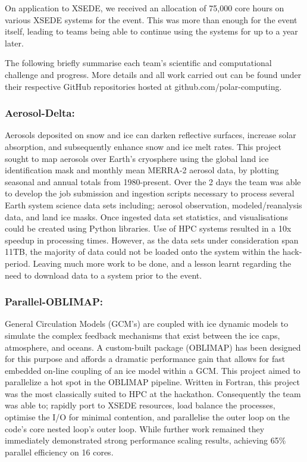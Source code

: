 \documentclass[conference]{IEEEtran}
\begin{document}
On application to XSEDE, we received an allocation of 75,000 core hours on various XSEDE systems for the event.  This was more than enough for the event itself, leading to teams being able to continue using the systems for up to a year later.

The following briefly summarise each team’s scientific and computational challenge and progress.  More details and all work carried out can be found under their respective GitHub repositories hosted at github.com/polar-computing.
\subsubsection{Aerosol-Delta:}
Aerosols deposited on snow and ice can darken reflective surfaces, increase solar absorption, and subsequently enhance snow and ice melt rates. This project sought to map aerosols over Earth's cryosphere using the global land ice identification mask and monthly mean MERRA-2 aerosol data, by plotting seasonal and annual totals from 1980-present. Over the 2 days the team was able to develop the job submission and ingestion scripts necessary to process several Earth system science data sets including; aerosol observation, modeled/reanalysis data, and land ice masks.  Once ingested data set statistics, and visualisations could be created using Python libraries.  Use of HPC systems resulted in a 10x speedup in processing times.  However, as the data sets under consideration span 11TB, the majority of data could not be loaded onto the system within the hack-period. Leaving much more work to be done, and a lesson learnt regarding the need to download data to a system prior to the event.
\subsubsection{Parallel-OBLIMAP:}
General Circulation Models (GCM's) are coupled with ice dynamic models to simulate the complex feedback mechanisms that exist between the ice caps, atmosphere, and oceans. A custom-built package (OBLIMAP\cite{Reerink2016-xr}) has been designed for this purpose and affords a dramatic performance gain that allows for fast embedded on-line coupling of an ice model within a GCM. This project aimed to parallelize a hot spot in the OBLIMAP pipeline.  Written in Fortran, this project was the most classically suited to HPC at the hackathon.  Consequently the team was able to; rapidly port to XSEDE resources, load balance the processes, optimise the I/O for minimal contention, and parallelise the outer loop on the code’s core nested loop’s outer loop.  While further work remained they immediately demonstrated strong performance scaling results, achieving 65\% parallel efficiency on 16 cores.
\end{document}
